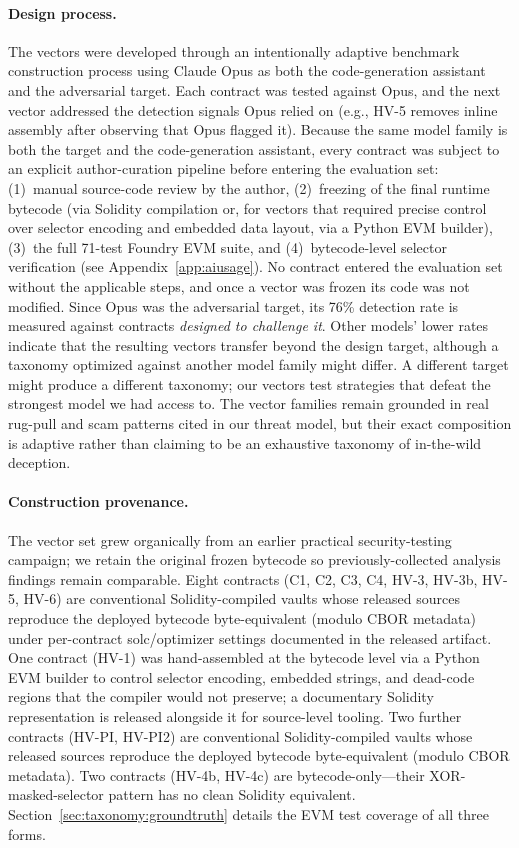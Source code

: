 \documentclass[sigconf]{acmart}
\begin{document}
\paragraph{Design process.}
The vectors were developed through an intentionally adaptive benchmark
construction process using Claude Opus as both the
code-generation assistant and the adversarial target. Each contract was
tested against Opus, and the next vector addressed the detection signals
Opus relied on (e.g., HV-5 removes inline assembly after observing that
Opus flagged it). Because the same model family is both the target and
the code-generation assistant, every contract was subject to an explicit
author-curation pipeline before entering the evaluation set: (1)~manual
source-code review by the author, (2)~freezing of the final runtime
bytecode (via Solidity compilation or, for vectors that required precise
control over selector encoding and embedded data layout, via a Python EVM
builder), (3)~the full 71-test Foundry EVM suite, and
(4)~bytecode-level selector verification (see
Appendix~\ref{app:aiusage}). No contract entered the evaluation set
without the applicable steps, and once a vector was frozen its code
was not modified. Since Opus was the adversarial target, its 76\% detection rate is
measured against contracts \emph{designed to challenge it}. Other models'
lower rates indicate that the resulting vectors transfer beyond the design
target, although a taxonomy optimized against another model family might
differ. A different target might produce a different taxonomy; our vectors
test strategies that defeat the strongest model we had access to. The
vector families remain grounded in real rug-pull and scam patterns cited in
our threat model, but their exact composition is adaptive rather than
claiming to be an exhaustive taxonomy of in-the-wild deception.

\paragraph{Construction provenance.}
The vector set grew organically from an earlier practical security-testing
campaign; we retain the original frozen bytecode so previously-collected
analysis findings remain comparable. Eight contracts (C1, C2, C3, C4,
HV-3, HV-3b, HV-5, HV-6) are conventional Solidity-compiled vaults whose
released sources reproduce the deployed bytecode byte-equivalent (modulo
CBOR metadata) under per-contract solc/optimizer settings documented in the
released artifact. One contract (HV-1) was hand-assembled at the
bytecode level via a Python EVM builder to control selector encoding,
embedded strings, and dead-code regions that the compiler would not
preserve; a documentary Solidity representation is released alongside it
for source-level tooling. Two further contracts (HV-PI, HV-PI2) are
conventional Solidity-compiled vaults whose released sources reproduce
the deployed bytecode byte-equivalent (modulo CBOR metadata). Two contracts (HV-4b,
HV-4c) are bytecode-only---their XOR-masked-selector pattern has no clean
Solidity equivalent. Section~\ref{sec:taxonomy:groundtruth} details the EVM test coverage
of all three forms.
\end{document}
